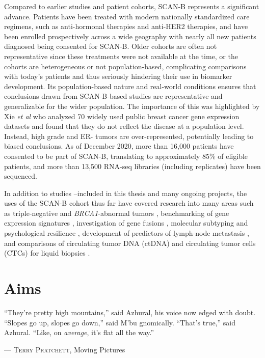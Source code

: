 \documentclass[11pt]{book}
\newcommand{\scanb}{\mbox{SCAN-B}}
\begin{document}
Compared to earlier studies and patient cohorts, SCAN-B represents a significant advance. Patients have been treated with modern nationally standardized care regimens, such as anti-hormonal therapies and anti-HER2 therapies, and have been enrolled prospectively across a wide geography with nearly all new patients diagnosed being consented for SCAN-B. Older cohorts are often not representative since these treatments were not available at the time, or the cohorts are heterogeneous or not population-based, complicating comparisons with today's patients and thus seriously hindering their use in biomarker development. Its population-based nature and real-world conditions ensures that conclusions drawn from SCAN-B-based studies are representative and generalizable for the wider population. The importance of this was highlighted by Xie \textit{et al} \cite{Xie:2020} who analyzed 70 widely used public breast cancer gene expression datasets and found that they do not reflect the disease at a population level. Instead, high grade and ER- tumors are over-represented, potentially leading to biased conclusions. As of December 2020, more than 16,000 patients have consented to be part of \scanb{}, translating to approximately 85\% of eligible patients, and more than 13,500 RNA-seq libraries (including replicates) have been sequenced.

In addition to studies \I--\IV included in this thesis and many ongoing projects, the uses of the SCAN-B cohort thus far have covered research into many areas such as triple-negative \cite{Staaf:2019} and \textit{BRCA1}-abnormal tumors \cite{Glodzik:2020}, benchmarking of gene expression signatures \cite{Vallon-Christersson:2019}, investigation of gene fusions \cite{Persson:2017}, molecular subtyping \cite{Lundgren:2019, Sokilde:2019} and psychological resilience \cite{Axelsson:2018}, development of predictors of lymph-node metastasis \cite{Dihge:2019}, and comparisons of circulating tumor DNA (ctDNA) and circulating tumor cells (CTCs) for liquid biopsies \cite{Fornvik:2019}.


\chapter{Aims}
\label{chap:aims}

\epigraph{``They're pretty high mountains,'' said Azhural, his voice now edged with doubt. ``Slopes go up, slopes go down,'' said M’bu gnomically. ``That's true,'' said Azhural. ``Like, on \textit{average}, it’s flat all the way.''}{--- \textsc{Terry Pratchett}\small\textnormal{, Moving Pictures}}
\end{document}
